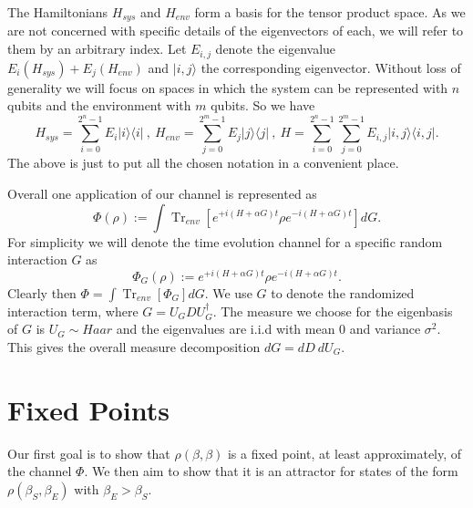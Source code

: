 \documentclass{article}
\newcommand{\ket}[1]{|#1\rangle}
\newcommand{\ketbra}[2]{| #1\rangle\! \langle #2|}
\newcommand{\brackets}[1]{\left[ #1 \right]}
\DeclareMathOperator{\Tr}{Tr}
\newcommand{\partrace}[2]{\Tr_{#1} \brackets{ #2 }}
\begin{document}
The Hamiltonians $H_{sys}$ and $H_{env}$ form a basis for the tensor product space. As we are not concerned with specific details of the eigenvectors of each, we will refer to them by an arbitrary index. Let $E_{i,j}$ denote the eigenvalue $E_i(H_{sys}) + E_j(H_{env})$ and $\ket{i,j}$ the corresponding eigenvector. Without loss of generality we will focus on spaces in which the system can be represented with $n$ qubits and the environment with $m$ qubits. So we have
\begin{equation}
    H_{sys} = \sum_{i = 0}^{2^n - 1} E_i \ketbra{i}{i} ~,~ H_{env} = \sum_{j=0}^{2^m - 1} E_j \ketbra{j}{j} ~,~ H = \sum_{i=0}^{2^n - 1} \sum_{j=0}^{2^m - 1} E_{i,j} \ketbra{i,j}{i,j}.
\end{equation}
The above is just to put all the chosen notation in a convenient place. 


Overall one application of our channel is represented as
\begin{equation}
    \Phi(\rho) := \int \partrace{env}{e^{+i(H + \alpha G)t} \rho e^{-i(H + \alpha G) t}} dG.
\end{equation}
For simplicity we will denote the time evolution channel for a specific random interaction $G$ as
\begin{equation}
    \Phi_G(\rho) := e^{+i (H+ \alpha G) t} \rho e^{-i (H + \alpha G) t}.
\end{equation}
Clearly then $\Phi = \int \partrace{env}{\Phi_G} dG$. We use $G$ to denote the randomized interaction term, where $G = U_G D U_G^\dagger$. The measure we choose for the eigenbasis of $G$ is $U_G \sim Haar$ and the eigenvalues are i.i.d with mean 0 and variance $\sigma^2$. This gives the overall measure decomposition $dG = dD ~ dU_G$. 
\section{Fixed Points}
Our first goal is to show that $\rho(\beta, \beta)$ is a fixed point, at least approximately, of the channel $\Phi$. We then aim to show that it is an attractor for states of the form $\rho(\beta_S, \beta_E)$ with $\beta_E > \beta_S$. 
\end{document}
